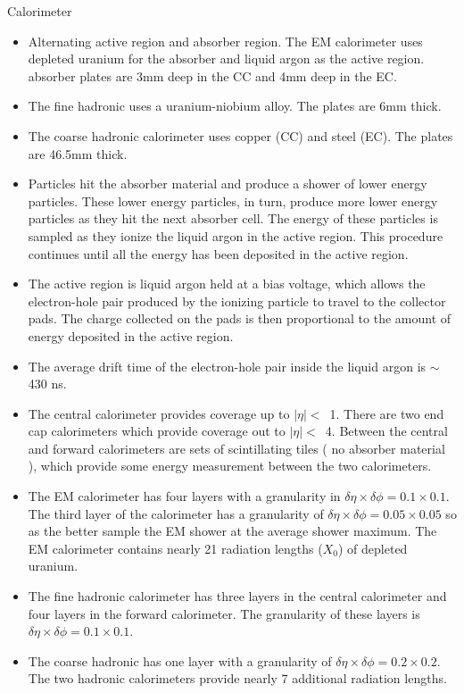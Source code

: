 Calorimeter
\begin{itemize}
\item Alternating active region and absorber region. The EM calorimeter uses depleted uranium for the absorber and liquid argon as the active region. absorber plates are 3mm deep in the CC and 4mm deep in the EC.
\item The fine hadronic uses a uranium-niobium alloy. The plates are 6mm thick.
\item The coarse hadronic calorimeter uses copper (CC) and steel (EC). The plates are 46.5mm thick.

\item Particles hit the absorber material and produce a shower of lower energy particles. These lower energy particles, in turn, produce more lower energy particles as they hit the next absorber cell. The energy of these particles is sampled as they ionize the liquid argon in the active region. This procedure continues until all the energy has been deposited in the active region.

\item The active region is liquid argon held at a bias voltage, which allows the electron-hole pair produced by the ionizing particle to travel to the collector pads. The charge collected on the pads is then proportional to the amount of energy deposited in the active region.
\item The average drift time of the electron-hole pair inside the liquid argon is $\sim$430 ns.

\item The central calorimeter provides coverage up to $|\eta| <$~1. There are two end cap calorimeters which provide coverage out to $|\eta| <$~4. Between the central and forward calorimeters are sets of scintillating tiles ( no absorber material ), which provide some energy measurement between the two calorimeters.

\item The EM calorimeter has four layers with a granularity in $\delta\eta \times \delta\phi = 0.1 \times 0.1$. The third layer of the calorimeter has a granularity of $\delta\eta \times \delta\phi = 0.05 \times 0.05$ so as the better sample the EM shower at the average shower maximum. The EM calorimeter contains nearly 21 radiation lengths ($X_{0}$) of depleted uranium.
\item The fine hadronic calorimeter has three layers in the central calorimeter and four layers in the forward calorimeter. The granularity of these layers is $\delta\eta \times \delta\phi = 0.1 \times 0.1$.
\item The coarse hadronic has one layer with a granularity of $\delta\eta \times \delta\phi = 0.2 \times 0.2$. The two hadronic calorimeters provide nearly 7 additional radiation lengths.


\end{itemize}
